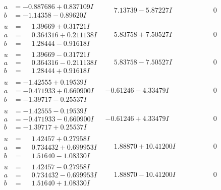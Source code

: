 \documentclass[1p]{elsarticle_modified}
\theoremstyle{definition}
\begin{document}
$$\begin{array}{c|c|c}
\begin{aligned}
a &= -0.887686 + 0.837109 I \\
b &= -1.14358 - 0.89620 I\end{aligned}
 & \phantom{-}7.13739 - 5.87227 I & \phantom{-0.000000 } 0 \\ \hline\begin{aligned}
u &= \phantom{-}1.39669 + 0.31721 I \\
a &= \phantom{-}0.364316 + 0.211138 I \\
b &= \phantom{-}1.28444 - 0.91618 I\end{aligned}
 & \phantom{-}5.83758 + 7.50527 I & \phantom{-0.000000 } 0 \\ \hline\begin{aligned}
u &= \phantom{-}1.39669 - 0.31721 I \\
a &= \phantom{-}0.364316 - 0.211138 I \\
b &= \phantom{-}1.28444 + 0.91618 I\end{aligned}
 & \phantom{-}5.83758 - 7.50527 I & \phantom{-0.000000 } 0 \\ \hline\begin{aligned}
u &= -1.42555 + 0.19539 I \\
a &= -0.471933 + 0.660900 I \\
b &= -1.39717 - 0.25537 I\end{aligned}
 & -0.61246 - 4.33479 I & \phantom{-0.000000 } 0 \\ \hline\begin{aligned}
u &= -1.42555 - 0.19539 I \\
a &= -0.471933 - 0.660900 I \\
b &= -1.39717 + 0.25537 I\end{aligned}
 & -0.61246 + 4.33479 I & \phantom{-0.000000 } 0 \\ \hline\begin{aligned}
u &= \phantom{-}1.42457 + 0.27958 I \\
a &= \phantom{-}0.734432 + 0.699953 I \\
b &= \phantom{-}1.51640 - 1.08330 I\end{aligned}
 & \phantom{-}1.88870 + 10.41200 I & \phantom{-0.000000 } 0 \\ \hline\begin{aligned}
u &= \phantom{-}1.42457 - 0.27958 I \\
a &= \phantom{-}0.734432 - 0.699953 I \\
b &= \phantom{-}1.51640 + 1.08330 I\end{aligned}
 & \phantom{-}1.88870 - 10.41200 I & \phantom{-0.000000 } 0 \\ \hline\begin{aligned}

\end{aligned}
\end{array}$$
\end{document}

